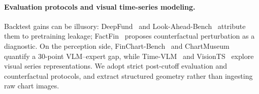 \paragraph{Evaluation protocols and visual time-series modeling.}
Backtest gains can be illusory: DeepFund~\cite{deepfund2025} and Look-Ahead-Bench~\cite{lookaheadbench2026} attribute them to pretraining leakage; FactFin~\cite{profitmirage2025} proposes counterfactual perturbation as a diagnostic. On the perception side, FinChart-Bench~\cite{finchartbench2025} and ChartMuseum~\cite{chartmuseum2025} quantify a 30-point VLM--expert gap, while Time-VLM~\cite{timevlm2025} and VisionTS~\cite{visionts2024} explore visual series representations. We adopt strict post-cutoff evaluation and counterfactual protocols, and extract structured geometry rather than ingesting raw chart images.
